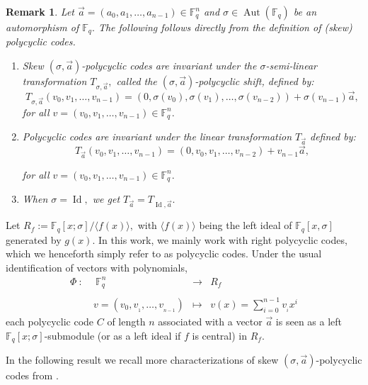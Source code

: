 \documentclass[12pt,paper]{article}
\theoremstyle{plain}
\newtheorem{remark}[theorem]{Remark}
\def\dsum #1#2{\displaystyle{\sum_{#1}^{#2}}}
\newcommand{\Fq}{\mathbb{F}_{q}}
\DeclareMathOperator{\aut}{Aut}
\DeclareMathOperator{\id}{Id}
\begin{document}
 \begin{remark}\label{remark1}
  Let $\vec{a}=(a_0,a_1,\ldots,a_{n-1}) \in \Fq^n$   and  $\sigma \in \aut(\Fq)$  be an automorphism of $\Fq.$ The following follows directly from the definition of (skew) polycyclic codes.
 \begin{enumerate}
 \item  Skew $(\sigma,\vec{a})$-polycyclic   codes are invariant under the $\sigma$-semi-linear transformation $  T_{\sigma,\vec{a}} ,$  called the \emph{$(\sigma,\vec{a})$-polycyclic  shift}, defined by:
 $$  T_{\sigma,\vec{a}} (v_0,v_1,\ldots,v_{n-1} )=  \left( 0, \sigma(v_0), \sigma(v_1), \ldots, \sigma(v_{n-2})\right)+ \sigma(v_{n-1})\vec{a}, $$
 for all $ v=(v_0,v_1,\ldots, v_{n-1}) \in \Fq^n.$
 \item Polycyclic  codes are invariant under the linear transformation $ T_{\vec{a}}$ defined by:
$$ T_{\vec{a}}(v_0,v_1,\ldots,v_{n-1} )=  \left( 0, v_0, v_1, \ldots, v_{n-2}\right)+ v_{n-1}\vec{a}, $$

for all $ v=(v_0,v_1,\ldots, v_{n-1}) \in \Fq^n.$
 \item  When $\sigma= \id,$ we get  $ T_{\vec{a}}= T_{\id,\vec{a}}.$
 \end{enumerate}
 \end{remark}

 Let $R_f:=\Fq[x;\sigma]/ \langle f(x)\rangle,$ with $ \langle f(x)\rangle $ being the left ideal of $\Fq[x,\sigma]$ generated by $g(x).$ In this work, we mainly work with right polycyclic codes, which we henceforth simply refer to as polycyclic codes. Under the usual identification of vectors with polynomials, 
   	\begin{equation}\label{Realization}
  	\begin{array}{rccc}
  	\Phi \ : \ & \ \Fq^n &\longrightarrow & R_f \\ & & & \\
  	  &v=(v_0, v_{_1},\ldots,v_{_{n-1}}) & \longmapsto &  v(x)=\dsum{i=0}{n-1} v_{_i} x^{i}  
  	\end{array}
  	\end{equation} 
each polycyclic code $C$ of length $n$  associated with a vector $\vec{a}$ is seen as a left $ \Fq[x;\sigma]$-submodule (or as a left ideal if $f$ is central)   in  $ R_{f}.$ 


In the following result we  recall more  characterizations of skew $(\sigma,\vec{a})$-polycyclic   codes from \cite[Theorem 4, Theorem 5]{Ouazzou2023}.
\end{document}
